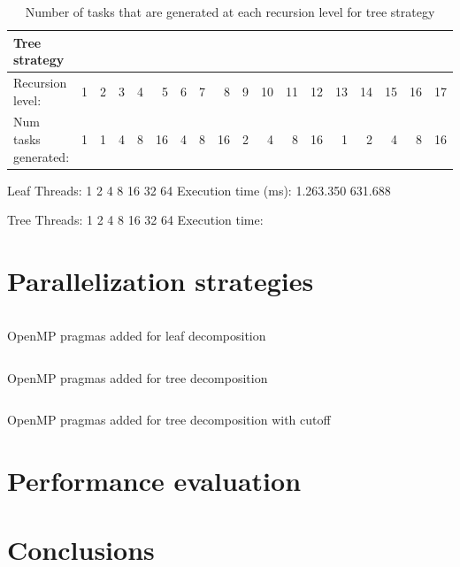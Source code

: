 \begin{table}[H]
\centering
\begin{tabular}{lrrrrrrrrrrrrrrrrr}
\toprule
Tree strategy & & & & & & & & & & & & & & & & &\\
\midrule
Recursion level:        & 1     & 2     & 3     & 4     & 5     & 6     & 7     & 8     & 9     & 10    & 11    & 12    & 13    & 14    & 15    & 16    & 17  \\
Num tasks generated:    & 1     & 1     & 4     & 8     & 16    & 4     & 8     & 16    & 2     & 4     & 8     & 16    & 1     & 2     & 4     & 8    & 16 \\
\bottomrule
\end{tabular}

Leaf
Threads: 1 2 4 8 16 32 64
Execution time (ms): 1.263.350  631.688

Tree
Threads: 1 2 4 8 16 32 64
Execution time: 

\caption{Number of tasks that are generated at each recursion level for tree strategy} 
\label{tab:Execution_time}
\end{table}


\section{Parallelization strategies}%
\label{sec:par_strats}


\begin{listing}[H]
\inputminted[firstline=32,lastline=63]{c}{sources/multisort-omp-leaf.c}
\caption{OpenMP pragmas added for leaf decomposition}
\label{listing:omp_leaf}
\end{listing}

\begin{listing}[H]
\inputminted[firstline=32,lastline=74]{c}{sources/multisort-omp-tree.c}
\caption{OpenMP pragmas added for tree decomposition}
\label{listing:omp_tree}
\end{listing}

\begin{listing}[H]
\inputminted[firstline=32,lastline=74]{c}{sources/multisort-omp-tree-cutoff.c}
\caption{OpenMP pragmas added for tree decomposition with cutoff}
\label{listing:omp_tree_cutoff}
\end{listing}

\section{Performance evaluation}%
\label{sec:perf_eval}

\section{Conclusions}%
\label{sec:conclusions}


